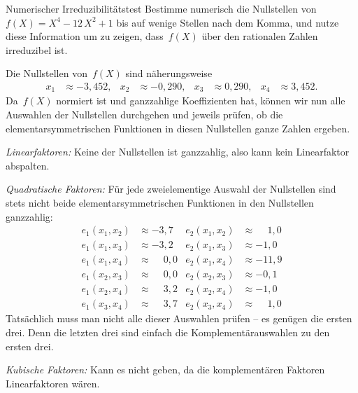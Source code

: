 \documentclass{algblatt}
\begin{document}
\vspace*{-1.5cm}

\begin{aufgabe}{Numerischer Irreduzibilitätstest}
Bestimme numerisch die Nullstellen von~$f(X) = X^4 - 12\,X^2 + 1$ bis auf
wenige Stellen nach dem Komma, und nutze diese Information um zu zeigen,
dass~$f(X)$ über den rationalen Zahlen irreduzibel ist.

\begin{loesung}
Die Nullstellen von~$f(X)$ sind näherungsweise
\begin{align*}
  x_1 &\approx -3{,}452, &
  x_2 &\approx -0{,}290, &
  x_3 &\approx 0{,}290, &
  x_4 &\approx 3{,}452.
\end{align*}
Da~$f(X)$ normiert ist und ganzzahlige Koeffizienten hat, können wir nun alle
Auswahlen der Nullstellen durchgehen und jeweils prüfen, ob die
elementarsymmetrischen Funktionen in diesen Nullstellen ganze Zahlen ergeben.

\emph{Linearfaktoren:} Keine der Nullstellen ist ganzzahlig, also kann kein
Linearfaktor abspalten.

\emph{Quadratische Faktoren:} Für jede zweielementige Auswahl der Nullstellen
sind stets nicht beide elementarsymmetrischen Funktionen in den Nullstellen
ganzzahlig:
\begin{align*}
  e_1(x_1,x_2) &\approx -3{,}7 &
  e_2(x_1,x_2) &\approx \phantom{+}1{,}0 \\
  e_1(x_1,x_3) &\approx -3{,}2 &
  e_2(x_1,x_3) &\approx -1{,}0 \\
  e_1(x_1,x_4) &\approx \phantom{+}0{,}0 &
  e_2(x_1,x_4) &\approx -11{,}9 \\
  e_1(x_2,x_3) &\approx \phantom{+}0{,}0 &
  e_2(x_2,x_3) &\approx -0{,}1 \\
  e_1(x_2,x_4) &\approx \phantom{+}3{,}2 &
  e_2(x_2,x_4) &\approx -1{,}0 \\
  e_1(x_3,x_4) &\approx \phantom{+}3{,}7 &
  e_2(x_3,x_4) &\approx \phantom{+}1{,}0
\end{align*}
Tatsächlich muss man nicht alle dieser Auswahlen prüfen -- es genügen die
ersten drei. Denn die letzten drei sind einfach die Komplementärauswahlen zu
den ersten drei.

\emph{Kubische Faktoren:} Kann es nicht geben, da die komplementären Faktoren
Linearfaktoren wären.
\end{loesung}
\end{aufgabe}
\end{document}
